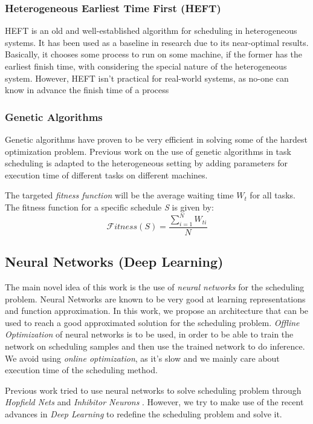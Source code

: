 \documentclass[twocolumn,11pt]{IEEEtran}
\begin{document}
\subsubsection{Heterogeneous Earliest Time First (HEFT)}
HEFT \cite{993206} is an old and well-established algorithm for scheduling in heterogeneous systems. It has been used as a baseline in research due to its near-optimal results. Basically, it chooses some process to run on some machine, if the former has the earliest finish time, with considering the special nature of the heterogeneous system. However, HEFT isn't practical for real-world systems, as no-one can know in advance the finish time of a process \\

\subsubsection{Genetic Algorithms}
Genetic algorithms \cite{article2} have proven to be very efficient in solving some of the hardest optimization problem. Previous work on the use of genetic algorithms in task scheduling \cite{article2} is adapted to the heterogeneous setting by adding parameters for execution time of different tasks on different machines.

The targeted \emph{fitness function} will be the average waiting time $W_t$ for all tasks. The fitness function for a specific schedule \emph{S} is given by:
\begin{equation}
\mathcal Fitness(S) = \frac{\sum_{i=1}^{N} W_{ti}}{N}
\end{equation}

\subsection{Neural Networks (Deep Learning)}
The main novel idea of this work is the use of \emph{neural networks} for the scheduling problem. Neural Networks are known to be very good at learning representations and function approximation. In this work, we propose an architecture that can be used to reach a good approximated solution for the scheduling problem. \emph{Offline Optimization} of neural networks is to be used, in order to be able to train the network on scheduling samples and then use the trained network to do inference. We avoid using \emph{online optimization}, as it's slow and we mainly care about execution time of the scheduling method.

Previous work tried to use neural networks to solve scheduling problem through \emph{Hopfield Nets} \cite{sathasivam2008logic} and \emph{Inhibitor Neurons} \cite{article3}. However, we try to make use of the recent advances in \emph{Deep Learning} to redefine the scheduling problem and solve it. 
\end{document}
